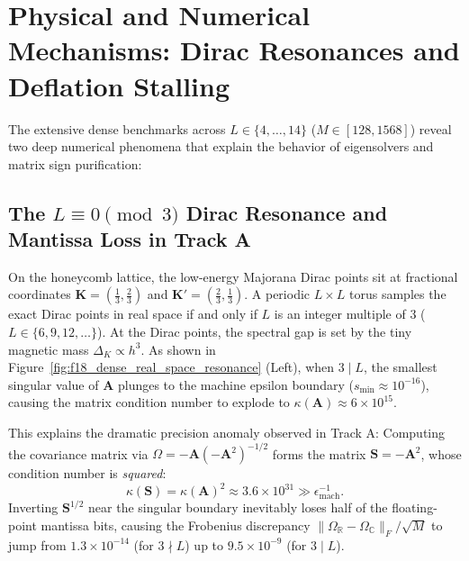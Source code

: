 


\section{Physical and Numerical Mechanisms: Dirac Resonances and Deflation Stalling}
\label{sec:m1_8_resonance_and_deflation}

The extensive dense benchmarks across $L \in \{4, \dots, 14\}$ ($M \in [128, 1568]$) reveal two deep numerical phenomena that explain the behavior of eigensolvers and matrix sign purification:

\subsection{The $L \equiv 0 \pmod 3$ Dirac Resonance and Mantissa Loss in Track A}
On the honeycomb lattice, the low-energy Majorana Dirac points sit at fractional coordinates $\mathbf{K} = (\frac{1}{3}, \frac{2}{3})$ and $\mathbf{K}' = (\frac{2}{3}, \frac{1}{3})$.
A periodic $L \times L$ torus samples the exact Dirac points in real space if and only if $L$ is an integer multiple of 3 ($L \in \{6, 9, 12, \dots\}$).
At the Dirac points, the spectral gap is set by the tiny magnetic mass $\Delta_K \propto h^3$.
As shown in Figure~\ref{fig:f18_dense_real_space_resonance} (Left), when $3 \mid L$, the smallest singular value of $\mathbf{A}$ plunges to the machine epsilon boundary ($s_{\min} \approx 10^{-16}$), causing the matrix condition number to explode to $\kappa(\mathbf{A}) \approx 6 \times 10^{15}$.

This explains the dramatic precision anomaly observed in Track A:
Computing the covariance matrix via $\Omega = -\mathbf{A}(-\mathbf{A}^2)^{-1/2}$ forms the matrix $\mathbf{S} = -\mathbf{A}^2$, whose condition number is \textit{squared}:
\begin{equation}
\kappa(\mathbf{S}) = \kappa(\mathbf{A})^2 \approx 3.6 \times 10^{31} \gg \epsilon_{\mathrm{mach}}^{-1}.
\end{equation}
Inverting $\mathbf{S}^{1/2}$ near the singular boundary inevitably loses half of the floating-point mantissa bits, causing the Frobenius discrepancy $\|\Omega_{\mathbb{R}} - \Omega_{\mathbb{C}}\|_F / \sqrt{M}$ to jump from $1.3 \times 10^{-14}$ (for $3 \nmid L$) up to $9.5 \times 10^{-9}$ (for $3 \mid L$).

